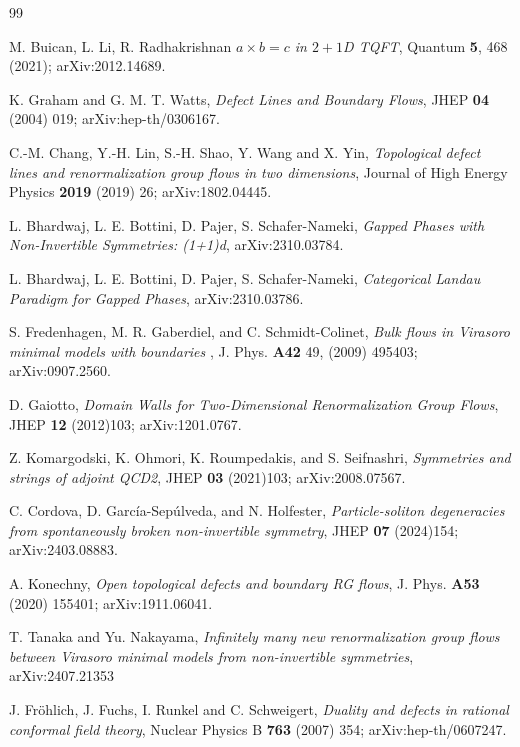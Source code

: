 \documentclass[a4paper,11pt]{article}
\theoremstyle{plain}
\theoremstyle{definition}
\begin{document}
\begin{thebibliography}{99}

 M. Buican, L. Li, R. Radhakrishnan
\emph{$a \times b = c$ in $2+1$D TQFT},
Quantum {\bf 5}, 468 (2021); 		arXiv:2012.14689.


 K. Graham and G. M. T. Watts, 
\emph{Defect Lines and Boundary Flows},
JHEP {\bf 04} (2004) 019; arXiv:hep-th/0306167.

C.-M. Chang, Y.-H. Lin, S.-H. Shao, Y. Wang and X. Yin,
\emph{Topological defect lines and renormalization group flows in two dimensions},
Journal of High Energy Physics {\bf 2019} (2019) 26; arXiv:1802.04445.



  L. Bhardwaj, L. E. Bottini, D. Pajer, S. Schafer-Nameki,
\emph{Gapped Phases with Non-Invertible Symmetries: (1+1)d},
arXiv:2310.03784.

 L. Bhardwaj, L. E. Bottini, D. Pajer, S. Schafer-Nameki,
\emph{Categorical Landau Paradigm for Gapped Phases}, arXiv:2310.03786.

 S. Fredenhagen, M. R. Gaberdiel, and C. Schmidt-Colinet, 
\emph{Bulk flows in Virasoro
minimal models with boundaries} , J. Phys. {\bf A42} 49, (2009) 495403; arXiv:0907.2560.

 D. Gaiotto, \emph{Domain Walls for Two-Dimensional Renormalization Group Flows}, JHEP
{\bf 12} (2012)103; arXiv:1201.0767.

 Z. Komargodski, K. Ohmori, K. Roumpedakis, and S. Seifnashri, \emph{Symmetries and
strings of adjoint QCD2}, JHEP {\bf 03} (2021)103; arXiv:2008.07567.

 C. Cordova, D. García-Sepúlveda, and N. Holfester, \emph{Particle-soliton degeneracies from
spontaneously broken non-invertible symmetry}, JHEP {\bf 07} (2024)154;
arXiv:2403.08883.

A. Konechny,
\emph{Open topological defects and boundary {RG} flows},
J. Phys. {\bf A53}  (2020) 155401; 	arXiv:1911.06041.

 T. Tanaka and Yu. Nakayama, \emph{Infinitely many new renormalization group flows between Virasoro minimal models from non-invertible symmetries}, arXiv:2407.21353

J. Fröhlich, J. Fuchs, I. Runkel and C. Schweigert,
\emph{Duality and defects in rational conformal field theory},
Nuclear Physics B {\bf 763} (2007) 354; 	arXiv:hep-th/0607247.


\end{thebibliography}
\end{document}
